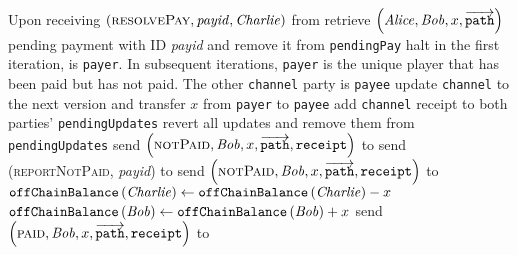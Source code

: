 \begin{functionality}{\fpaynet}
\begin{algorithmic}[1]
    \State Upon receiving $\left(\textsc{resolvePay}, \mathit{payid},
    \mathit{Charlie}\right)$ from \simulator
    \Indent
      \State retrieve $\left(\mathit{Alice}, \mathit{Bob}, x,
      \overrightarrow{\mathtt{path}}\right)$ pending payment with ID
      \textit{payid} and remove it from \texttt{pendingPay}
        \State halt 
        \State {}
      \Else
          \State in the first iteration, \charlie is \texttt{payer}. In
          subsequent iterations, \texttt{payer} is the unique player that has
          been paid but has not paid. The other \texttt{channel} party is
          \texttt{payee}
            \State update \texttt{channel} to the next version and transfer $x$
            from \texttt{payer} to \texttt{payee}
            \State add \texttt{channel} receipt to both parties'
            \texttt{pendingUpdates}
          \Else
            \State revert all updates and remove them from
            \texttt{pendingUpdates}
            \State {}
              \State send $\left(\textsc{notPaid}, \mathit{Bob}, x,
              \overrightarrow{\mathtt{path}}, \mathtt{receipt}\right)$ to \alice
            \Else
              \State send (\textsc{reportNotPaid}, \textit{payid}) to
              \simulator {}
                \State send $\left(\textsc{notPaid}, \mathit{Bob}, x,
                \overrightarrow{\mathtt{path}}, \mathtt{receipt}\right)$ to
                \alice
              \EndIf
            \EndIf
            \State {}
          \EndIf
        \EndFor
        \State $\mathtt{offChainBalance}\left(\mathit{Charlie}\right) \gets
        \mathtt{offChainBalance}\left(\mathit{Charlie}\right) - x$
        \State $\mathtt{offChainBalance}\left(\mathit{Bob}\right) \gets
        \mathtt{offChainBalance}\left(\mathit{Bob}\right) + x$
        \If{\charlie{} = \alice}
          \State send $\left(\textsc{paid}, \mathit{Bob}, x,
          \overrightarrow{\mathtt{path}}, \mathtt{receipt}\right)$ to \alice
        \EndIf
      \EndIf
    \EndIndent
    \State


\end{algorithmic}
\end{functionality}
